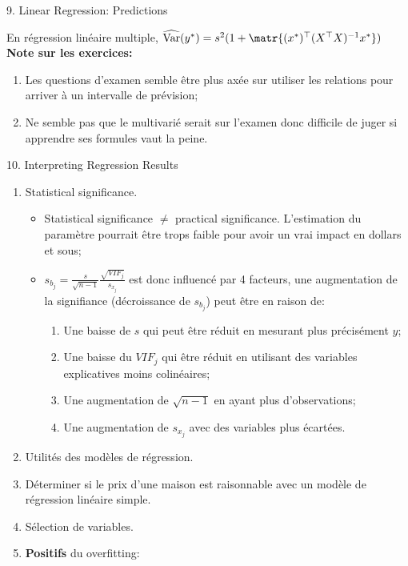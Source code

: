 \documentclass[12pt, titlepage, french]{report}
\begin{document}
\begin{CHPT_SUMM}[label = {PREV-PREDICTIONS}]{9. Linear Regression:  Predictions}
En régression linéaire multiple, $\widehat{\text{Var}}(y^{*}) = s^{2}(1 + \matr{(x^{*})^{\top}(X^{\top}X)^{-1}x^{*}})$
\textbf{Note sur les exercices:} 
\begin{enumerate}
	\item	Les questions d'examen semble être plus axée sur utiliser les relations pour arriver à un intervalle de prévision;
	\item	Ne semble pas que le multivarié serait sur l'examen donc difficile de juger si apprendre ses formules vaut la peine.
\end{enumerate}
\end{CHPT_SUMM}

\begin{CHPT_SUMM}[label = {PREV-INTERP}]{10. Interpreting Regression Results}
\begin{enumerate}
	\item	Statistical significance.
	\begin{itemize}
		\item	Statistical significance $\neq$ practical significance. L'estimation du paramètre pourrait être trops faible pour avoir un vrai impact en dollars et sous;
		\item	$s_{b_{j}} = \frac{s}{\sqrt{n - 1}}\frac{\sqrt{VIF_{j}}}{s_{x_{j}}}$ est donc influencé par 4 facteurs, une augmentation de la signifiance (décroissance de $s_{b_{j}}$) peut être en raison de:
		\begin{enumerate}
			\item	Une baisse de $s$ qui peut être réduit en mesurant plus précisément $y$;
			\item	Une baisse du $VIF_{j}$ qui être réduit en utilisant des variables explicatives moins colinéaires;
			\item	Une augmentation de $\sqrt{n - 1}$ en ayant plus d'observations;
			\item	Une augmentation de $s_{x_{j}}$ avec des variables plus écartées.
		\end{enumerate}
	\end{itemize}
	\item	Utilités des modèles de régression.
	\item[]	Déterminer si le prix d'une maison est raisonnable avec un modèle de régression linéaire simple.
	\item	Sélection de variables.
	\item[]	\textbf{Positifs} du overfitting:
	\begin{itemize}

\end{itemize}
\end{enumerate}
\end{CHPT_SUMM}
\end{document}
